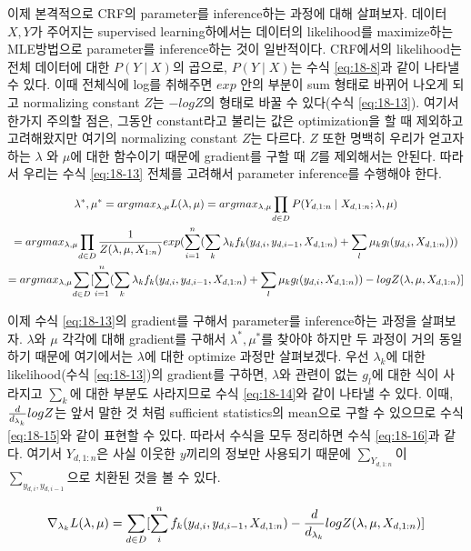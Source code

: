 \documentclass[draft=false]{oblivoir}
\begin{document}
이제 본격적으로 CRF의 parameter를 inference하는 과정에 대해 살펴보자. 데이터 $X,Y$가 주어지는 supervised learning하에서는 데이터의 likelihood를 maximize하는 MLE방법으로 parameter를 inference하는 것이 일반적이다. CRF에서의 likelihood는 전체 데이터에 대한 $P(Y\mid X)$의 곱으로, $P(Y\mid X)$는 수식 \ref{eq:18-8}과 같이 나타낼 수 있다. 이때 전체식에 log를 취해주면 $exp$ 안의 부분이 sum 형태로 바뀌어 나오게 되고 normalizing constant $Z$는 $-log Z$의 형태로 바꿀 수 있다(수식 \ref{eq:18-13}).
여기서 한가지 주의할 점은, 그동안 constant라고 불리는 값은 optimization을 할 때 제외하고 고려해왔지만 여기의 normalizing constant $Z$는 다르다. $Z$ 또한 명백히 우리가 얻고자 하는 $\lambda$ 와 $\mu$에 대한 함수이기 때문에 gradient를 구할 때 $Z$를 제외해서는 안된다. 따라서 우리는 수식 \ref{eq:18-13} 전체를 고려해서 parameter inference를 수행해야 한다. 


\begin{gather}
    \lambda^*,\mu^* = argmax_{\lambda,\mu}L(\lambda,\mu) = argmax_{\lambda,\mu} {\prod_{d\in D}P(Y_{d,1:n}\mid X_{d,1:n};\lambda,\mu)} \nonumber \\
    = argmax_{\lambda,\mu}{\prod_{d\in D} 
	{1 \over Z(\lambda,\mu,X_{1:n})}exp(\sum_{i=1}^{n}(\sum_k\lambda_k f_k(y_{d,i},y_{d,i-1},X_{d,1:n})+\sum_l{\mu_k g_l(y_{d,i},X_{d,1:n})}))} \nonumber \\
	= argmax_{\lambda,\mu}{\sum_{d\in D}[\sum_{i=1}^n(\sum_k\lambda_k f_k(y_{d,i},y_{d,i-1},X_{d,1:n})+\sum_l{\mu_k g_l(y_{d,i},X_{d,1:n})})-log Z(\lambda,\mu,X_{d,1:n})]}
\label{eq:18-13}
\end{gather}

이제 수식 \ref{eq:18-13}의 gradient를 구해서 parameter를 inference하는 과정을 살펴보자. $\lambda$와 $\mu$ 각각에 대해 gradient를 구해서 $\lambda^*, \mu^*$를 찾아야 하지만 두 과정이 거의 동일하기 때문에 여기에서는 $\lambda$에 대한 optimize 과정만 살펴보겠다. 우선 $\lambda_k$에 대한 likelihood(수식 \ref{eq:18-13})의 gradient를 구하면, $\lambda$와 관련이 없는 $g_l$에 대한 식이 사라지고 $\sum_k$에 대한 부분도 사라지므로 수식 \ref{eq:18-14}와 같이 나타낼 수 있다. 이때, ${d\over d_{\lambda_k}} logZ$는 앞서 말한 것 처럼 sufficient statistics의 mean으로 구할 수 있으므로 수식 \ref{eq:18-15}와 같이 표현할 수 있다. 따라서 수식을 모두 정리하면 수식 \ref{eq:18-16}과 같다. 여기서 $Y_{d,1:n}$은 사실 이웃한 $y$끼리의 정보만 사용되기 때문에  $\sum_{Y_{d,1:n}}$이 $\sum_{y_{d,i},y_{d,i-1}}$으로 치환된 것을 볼 수 있다.

\begin{equation}
    \nabla_{\lambda_k}L(\lambda,\mu) = {\sum_{d\in D}[\sum_i^n f_k(y_{d,i},y_{d,i-1},X_{d,1:n})-{d\over d_{\lambda_k}}log Z(\lambda,\mu,X_{d,1:n})] }
\label{eq:18-14}   
\end{equation}
\end{document}
